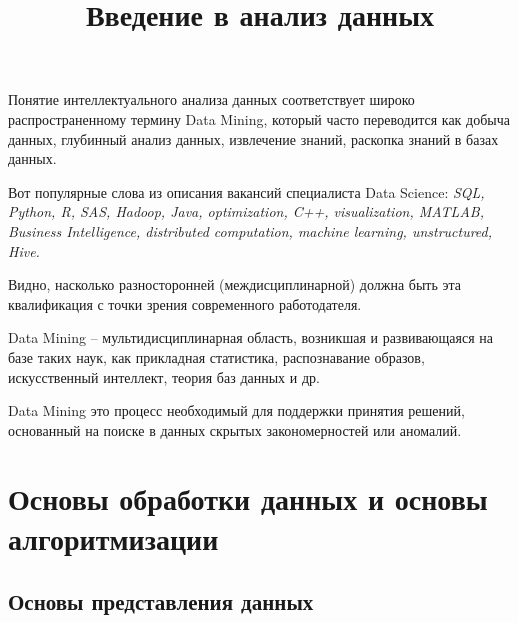 \documentclass{beamer}
\title{Введение в анализ данных}
\begin{document}
\maketitle




 


\begin{frame}
Понятие интеллектуального анализа данных соответствует широко
распространенному термину Data Mining, который часто переводится как
добыча данных, глубинный анализ данных, извлечение знаний, раскопка
знаний в базах данных.
\end{frame}

\begin{frame}

Вот  популярные слова   из описания вакансий  специалиста Data Science: 
\it{
SQL, Python, R,  SAS, Hadoop, Java, 
optimization, C++, visualization, MATLAB,  Business Intelligence, 
distributed computation, 
machine learning, 
unstructured,
Hive.}


Видно, насколько разносторонней  (междисциплинарной)  должна быть эта квалификация с
точки зрения современного работодателя.   


\end{frame}


\begin{frame}

Data Mining -- мультидисциплинарная область, возникшая и развивающаяся на базе таких наук, 
как прикладная статистика, распознавание образов, искусственный интеллект, теория баз данных и др.

 Data Mining это процесс необходимый для  поддержки принятия решений, основанный на
поиске в данных скрытых закономерностей или аномалий.

\end{frame}
 


\section{Основы обработки данных и  основы алгоритмизации}

\subsection{Основы представления данных}
\end{document}
